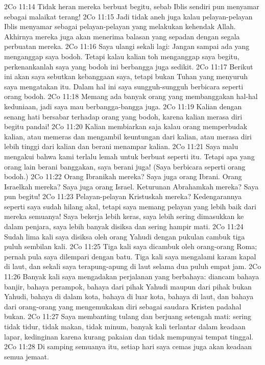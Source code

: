 2Co 11:14  Tidak heran mereka berbuat begitu, sebab Iblis sendiri pun menyamar sebagai malaikat terang!
2Co 11:15  Jadi tidak aneh juga kalau pelayan-pelayan Iblis menyamar sebagai pelayan-pelayan yang melakukan kehendak Allah. Akhirnya mereka juga akan menerima balasan yang sepadan dengan segala perbuatan mereka.
2Co 11:16  Saya ulangi sekali lagi: Jangan sampai ada yang menganggap saya bodoh. Tetapi kalau kalian toh menganggap saya begitu, perkenankanlah saya yang bodoh ini berbangga juga sedikit.
2Co 11:17  Berikut ini akan saya sebutkan kebanggaan saya, tetapi bukan Tuhan yang menyuruh saya mengatakan itu. Dalam hal ini saya sungguh-sungguh berbicara seperti orang bodoh.
2Co 11:18  Memang ada banyak orang yang membanggakan hal-hal keduniaan, jadi saya mau berbangga-bangga juga.
2Co 11:19  Kalian dengan senang hati bersabar terhadap orang yang bodoh, karena kalian merasa diri begitu pandai!
2Co 11:20  Kalian membiarkan saja kalau orang memperbudak kalian, atau memeras dan mengambil keuntungan dari kalian, atau merasa diri lebih tinggi dari kalian dan berani menampar kalian.
2Co 11:21  Saya malu mengakui bahwa kami terlalu lemah untuk berbuat seperti itu. Tetapi apa yang orang lain berani banggakan, saya berani juga! (Saya berbicara seperti orang bodoh.)
2Co 11:22  Orang Ibranikah mereka? Saya juga orang Ibrani. Orang Israelkah mereka? Saya juga orang Israel. Keturunan Abrahamkah mereka? Saya pun begitu!
2Co 11:23  Pelayan-pelayan Kristuskah mereka? Kedengarannya seperti saya sudah hilang akal, tetapi saya memang pelayan yang lebih baik dari mereka semuanya! Saya bekerja lebih keras, saya lebih sering dimasukkan ke dalam penjara, saya lebih banyak disiksa dan sering hampir mati.
2Co 11:24  Sudah lima kali saya disiksa oleh orang Yahudi dengan pukulan cambuk tiga puluh sembilan kali.
2Co 11:25  Tiga kali saya dicambuk oleh orang-orang Roma; pernah pula saya dilempari dengan batu. Tiga kali saya mengalami karam kapal di laut, dan sekali saya terapung-apung di laut selama dua puluh empat jam.
2Co 11:26  Banyak kali saya mengadakan perjalanan yang berbahaya: diancam bahaya banjir, bahaya perampok, bahaya dari pihak Yahudi maupun dari pihak bukan Yahudi, bahaya di dalam kota, bahaya di luar kota, bahaya di laut, dan bahaya dari orang-orang yang mengemukakan diri sebagai saudara Kristen padahal bukan.
2Co 11:27  Saya membanting tulang dan berjuang setengah mati: sering tidak tidur, tidak makan, tidak minum, banyak kali terlantar dalam keadaan lapar, kedinginan karena kurang pakaian dan tidak mempunyai tempat tinggal.
2Co 11:28  Di samping semuanya itu, setiap hari saya cemas juga akan keadaan semua jemaat.
